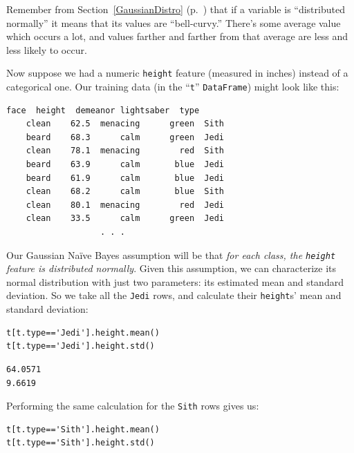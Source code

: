 Remember from Section~\ref{GaussianDistro} (p.~\pageref{GaussianDistro}) that
if a variable is ``distributed normally'' it means that its values are
``bell-curvy.'' There's some average value which occurs a lot, and values
farther and farther from that average are less and less likely to occur.

Now suppose we had a numeric \texttt{height} feature (measured in inches)
instead of a categorical one. Our training data (in the ``\texttt{t}''
\texttt{DataFrame}) might look like this:

\begin{Verbatim}[fontsize=\small,samepage=true,frame=leftline,framesep=5mm,framerule=1mm]
     face  height  demeanor lightsaber  type
    clean    62.5  menacing      green  Sith
    beard    68.3      calm      green  Jedi
    clean    78.1  menacing        red  Sith
    beard    63.9      calm       blue  Jedi
    beard    61.9      calm       blue  Jedi
    clean    68.2      calm       blue  Sith
    clean    80.1  menacing        red  Jedi
    clean    33.5      calm      green  Jedi
                   . . .
\end{Verbatim}


Our Gaussian Na\"{i}ve Bayes assumption will be that \textit{for each class,
the \texttt{height} feature is distributed normally}. Given this assumption, we
can characterize its normal distribution with just two parameters: its
estimated mean and standard deviation. So we take all the \texttt{Jedi} rows,
and calculate their \texttt{height}s' mean and standard deviation:

\begin{Verbatim}[fontsize=\small,samepage=true,frame=single,framesep=3mm]
t[t.type=='Jedi'].height.mean()
t[t.type=='Jedi'].height.std()
\end{Verbatim}
\vspace{-.3in}

\begin{Verbatim}[fontsize=\small,samepage=true,frame=leftline,framesep=5mm,framerule=1mm]
64.0571
9.6619
\end{Verbatim}

\vspace{.1in}
Performing the same calculation for the \texttt{Sith} rows gives us:

\begin{Verbatim}[fontsize=\small,samepage=true,frame=single,framesep=3mm]
t[t.type=='Sith'].height.mean()
t[t.type=='Sith'].height.std()
\end{Verbatim}
\vspace{-.3in}

